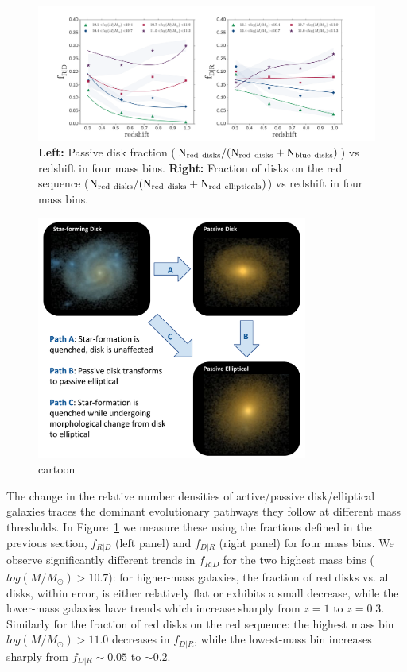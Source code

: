 \documentclass[useAMS,usenatbib]{mn2e}
\begin{document}
\begin{figure}
\centering
\includegraphics[width=\textwidth,trim={0cm 0cm 2cm 1cm},clip]{figures/fractions_modeled.pdf}
\caption{\textbf{Left:} Passive disk fraction ($\rm N_{red~disks}/(N_{red~disks}+N_{blue~disks})$) vs redshift in four mass bins. \textbf{Right:} Fraction of disks on the red sequence ($\rm N_{red~disks}/(N_{red~disks}+N_{red~ellipticals})$) vs redshift in four mass bins.}
\label{fig:f_results}
\end{figure}

\begin{figure}
\centering
\includegraphics[width=3.5in]{figures/cartoon.pdf}
\caption{cartoon}
\label{fig:cartoon}
\end{figure}
The change in the relative number densities of active/passive disk/elliptical galaxies traces the dominant evolutionary pathways they follow at different mass thresholds. In Figure~\ref{fig:f_results} we measure these using the fractions defined in the previous section, $f_{R|D}$ (left panel) and $f_{D|R}$ (right panel) for four mass bins. We observe significantly different trends in $f_{R|D}$ for the two highest mass bins ($log(M/M_{\odot})>10.7$): for higher-mass galaxies, the fraction of red disks vs. all disks, within error, is either relatively flat or exhibits a small decrease, while the lower-mass galaxies have trends which increase sharply from $z=1$ to $z=0.3$. Similarly for the fraction of red disks on the red sequence: the highest mass bin $log(M/M_{\odot})>11.0$ decreases in $f_{D|R}$, while the lowest-mass bin increases sharply from $f_{D|R}\sim0.05$ to $\sim 0.2$.  
\end{document}
